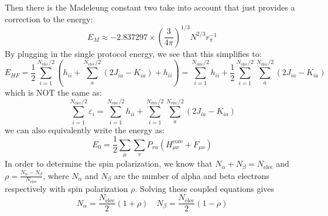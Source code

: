 \documentclass[12pt]{article}
\begin{document}
Then there is the Madeleung constant two take into account that just provides a correction to the energy:
\begin{equation}
E_M \approx-2.837297 \times\left(\frac{3}{4 \pi}\right)^{1 / 3} N^{2 / 3} r_\pi^{-1}
\end{equation}
By plugging in the single protocol energy, we see that this simplifies to:
\begin{equation}
    E_{HF} = \frac{1}{2} \sum_{i=1}^{N_\text{elec}/2} \left(h_{ii} + \sum_{a}^{N_\text{elec}/2} \left(2J_{ia} - K_{ia}\right) + h_{ii}\right) = \sum_{i=1}^{N_\text{elec}/2} h_{ii} + \frac{1}{2} \sum_{i=1}^{N_\text{elec}/2} \sum_{a}^{N_\text{elec}/2} \left(2J_{ia} - K_{ia}\right)
\end{equation}
which is NOT the same as:
\begin{equation}
    \sum_{i=1}^{N_\text{elec}/2} \varepsilon_i = \sum_{i=1}^{N_\text{elec}/2} h_{ii} + \sum_{i=1}^{N_\text{elec}/2} \sum_{a}^{N_\text{elec}/2} \left(2J_{ia} - K_{ia}\right) 
\end{equation}
we can also equivalently write the energy as:
\begin{equation}
    E_0=\frac{1}{2} \sum_\mu \sum_v P_{v u}\left(H_{\mu \nu}^{\mathrm{core}}+F_{\mu \nu}\right)
\end{equation}
In order to determine the spin polarization, we know that $N_{\alpha }+N_{\beta } = N_{\text{elec}}$ and $\rho = \frac{N_{\alpha }-N_{\beta }}{N_{\text{elec}}}$, where $N_{\alpha }$ and $N_{\beta }$ are the number of alpha and beta electrons respectively with spin polarization $\rho$. Solving these coupled equations gives
\begin{equation}
    N_{\alpha } = \frac{N_{\text{elec}}}{2} \left(1 + \rho\right) \quad N_{\beta } = \frac{N_{\text{elec}}}{2} \left(1 - \rho\right)
\end{equation}
\end{document}
